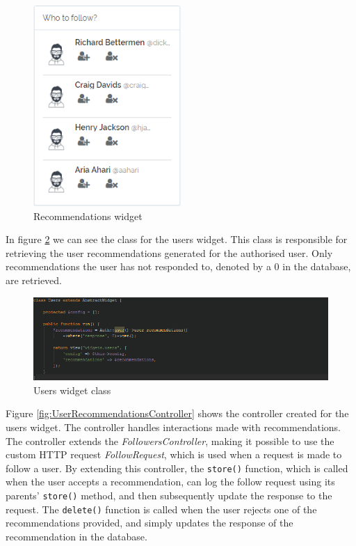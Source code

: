 \begin{figure}[H]
\centering
\includegraphics[height=3in]{Images/Implementation/RecommendationsWidget}
\caption{Recommendations widget}
\label{fig:RecommendationsWidget}
\end{figure}

In figure \ref{fig:UsersWidget} we can see the class for the users widget. This class is responsible for retrieving the user recommendations generated for the authorised user. Only recommendations the user has not responded to, denoted by a 0 in the database, are retrieved. 

\begin{figure}[H]
\centering
\includegraphics[width=1\textwidth]{Images/Implementation/UsersWidget}
\caption{Users widget class}
\label{fig:UsersWidget}
\end{figure}

Figure \ref{fig:UserRecommendationsController} shows the controller created for the users widget. The controller handles interactions made with recommendations. The controller extends the \textit{FollowersController}, making it possible to use the custom HTTP request \textit{FollowRequest}, which is used when a request is made to follow a user. By extending this controller, the \texttt{store()} function, which is called when the user accepts a recommendation, can log the follow request using its parents' \texttt{store()} method, and then subsequently update the response to the request. The \texttt{delete()} function is called when the user rejects one of the recommendations provided, and simply updates the response of the recommendation in the database.


